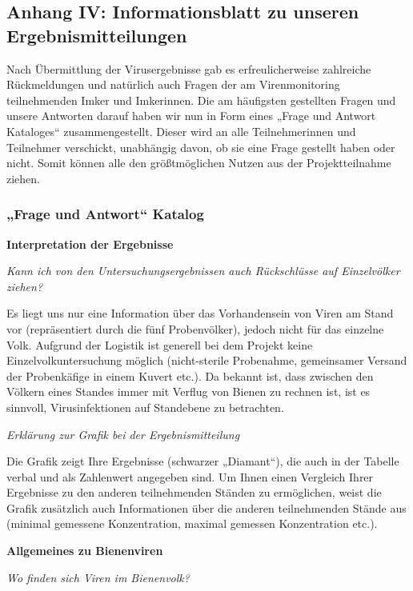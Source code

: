 \subsection{Anhang IV: Informationsblatt zu unseren Ergebnismitteilungen} \label{chap:anhang_FAQ}


Nach Übermittlung der Virusergebnisse gab es erfreulicherweise zahlreiche Rückmeldungen und natürlich auch Fragen der am Virenmonitoring teilnehmenden Imker und Imkerinnen. Die am häufigsten gestellten Fragen und unsere Antworten darauf haben wir nun in Form eines „Frage und Antwort Kataloges“ zusammengestellt. Dieser wird an alle Teilnehmerinnen und Teilnehmer verschickt, unabhängig davon, ob sie eine Frage gestellt haben oder nicht. Somit können alle den größtmöglichen Nutzen aus der Projektteilnahme ziehen.

%

\subsubsection{„Frage und Antwort“ Katalog}
\textbf{Interpretation der Ergebnisse}

\textit{Kann ich von den Untersuchungsergebnissen auch Rückschlüsse auf Einzelvölker ziehen?}

Es liegt uns nur eine Information über das Vorhandensein von Viren am Stand vor (repräsentiert durch die fünf Probenvölker), jedoch nicht für das einzelne Volk. Aufgrund der Logistik ist generell bei dem Projekt keine Einzelvolkuntersuchung möglich (nicht-sterile Probenahme, gemeinsamer Versand der Probenkäfige in einem Kuvert etc.). Da bekannt ist, dass zwischen den Völkern eines Standes immer mit Verflug von Bienen zu rechnen ist, ist es sinnvoll, Virusinfektionen auf Standebene zu betrachten.


\textit{Erklärung zur Grafik bei der Ergebnismitteilung}

Die Grafik zeigt Ihre Ergebnisse (schwarzer „Diamant“), die auch in der Tabelle verbal und als Zahlenwert angegeben sind. Um Ihnen einen Vergleich Ihrer Ergebnisse zu den anderen teilnehmenden Ständen zu ermöglichen, weist die Grafik zusätzlich auch Informationen über die anderen teilnehmenden Stände aus (minimal gemessene Konzentration, maximal gemessen Konzentration etc.).

\textbf{Allgemeines zu Bienenviren}

\textit{Wo finden sich Viren im Bienenvolk?}

